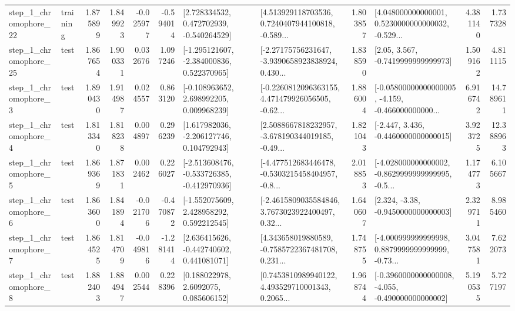 \begin{tabular}{llrrrrllrlrr}
    step\_1\_chromophore\_22 &  training &      1.875899 &    1.849923 &     -0.025977 & -0.594014 &    [2.728334532, 0.472702939, -0.540264529] &  [4.513929118703536, 0.7240407944100818, -0.589... &       1.803857 &  [4.048000000000001, 0.5230000000000032, -0.529... &            4.381140 &          1.737328 \\
    step\_1\_chromophore\_25 &      test &      1.867654 &    1.900331 &      0.032676 &  1.097246 &   [-1.295121607, -2.384000836, 0.522370965] &  [-2.27175756231647, -3.9390658923838924, 0.430... &       1.838590 &                 [2.05, 3.567, -0.7419999999999973] &            1.509162 &          4.811115 \\
     step\_1\_chromophore\_3 &      test &      1.890430 &    1.914987 &      0.024557 &  0.863120 &    [-0.108963652, 2.698992205, 0.009968239] &  [-0.2260812096363155, 4.471479926056505, -0.62... &       1.886004 &  [-0.05800000000000005, -4.159, -0.466000000000... &            6.916742 &         14.789611 \\
     step\_1\_chromophore\_4 &      test &      1.813340 &    1.818238 &      0.004897 &  0.296239 &    [1.617982036, -2.206127746, 0.104792943] &  [2.5088667818232957, -3.678190344019185, -0.49... &       1.821043 &               [-2.447, 3.436, -0.4460000000000015] &            3.923725 &         12.388963 \\
     step\_1\_chromophore\_5 &      test &      1.869369 &    1.871831 &      0.002462 &  0.226027 &  [-2.513608476, -0.533726385, -0.412970936] &  [-4.477512683446478, -0.5303215458404957, -0.8... &       2.018853 &  [-4.028000000000002, -0.8629999999999995, -0.5... &            1.174773 &          6.105667 \\
     step\_1\_chromophore\_6 &      test &      1.863600 &    1.841894 &     -0.021706 & -0.470872 &    [-1.552075609, 2.428958292, 0.592212545] &  [-2.4615809035584846, 3.7673023922400497, 0.32... &       1.640607 &                [2.324, -3.38, -0.9450000000000003] &            2.329711 &          8.985460 \\
     step\_1\_chromophore\_7 &      test &      1.864525 &    1.814709 &     -0.049816 & -1.281414 &    [2.636415626, -0.442740602, 0.441081071] &  [4.343658019880589, -0.7585722367481708, 0.231... &       1.748755 &  [-4.000999999999998, 0.8879999999999999, -0.73... &            3.047581 &          7.622073 \\
     step\_1\_chromophore\_8 &      test &      1.882403 &    1.884947 &      0.002544 &  0.228396 &       [0.188022978, 2.6092075, 0.085606152] &  [0.7453810989940122, 4.493529710001343, 0.2065... &       1.968744 &  [-0.3960000000000008, -4.055, -0.490000000000002] &            5.190535 &          5.727197 \\

\end{tabular}
